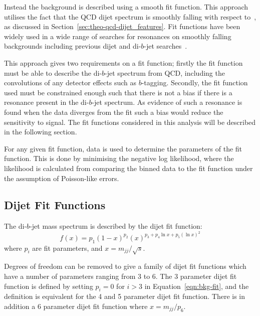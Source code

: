Instead the background is described using a smooth fit function.
This approach utilises the fact that the QCD dijet spectrum
is smoothly falling with respect to~\mjj,
as discussed in Section~\ref{sec:theo-qcd-dijet_features}.
Fit functions have been widely used
in a wide range of searches for resonances on smoothly falling backgrounds
including previous dijet and di-$b$-jet searches~\cite{dijet-mori16_paper,dibjet-mori16_paper}.

This approach gives two requirements on a fit function;
firstly the fit function must be able to describe the di-$b$-jet spectrum from QCD,
including the convolutions of any detector effects such as $b$-tagging.
Secondly,  the fit function used must be constrained enough
such that there is not a bias if there is a resonance present in the di-$b$-jet spectrum.
As evidence of such a resonance is found when the data diverges from the fit
such a bias would reduce the sensitivity to signal.
The fit functions considered in this analysis will be described in the following section.

For any given fit function, 
data is used to determine the parameters of the fit function.
This is done by minimising the negative log likelihood,
where the likelihood is calculated from comparing
the binned data to the fit function
under the assumption of Poisson-like errors.

\subsection{Dijet Fit Functions}
\label{sec:bkg-bkg_func}

The di-$b$-jet mass spectrum is described by the dijet fit function:
\begin{equation}
  f(x)=p_1(1-x)^{p_2}(x)^{p_3+p_4\ln{x}+p_5(\ln{x})^{2}}
\label{eqn:bkg-fit}
\end{equation}
where $p_i$ are fit parameters, and $x=m_{jj}/\sqrt{s}$.

Degrees of freedom can be removed to give a family of dijet fit functions which have a number of parameters ranging from 3 to 6.
The 3 parameter dijet fit function is defined by setting $p_{i} = 0$ for $i > 3$ in Equation~\ref{eqn:bkg-fit},
and the definition is equivalent for the 4 and 5 parameter dijet fit function.
There is in addition a 6 parameter dijet fit function where $x=m_{jj}/p_6$.

